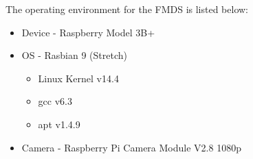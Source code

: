 The operating environment for the FMDS is listed below: 
\begin{itemize} 
	\item Device - Raspberry Model 3B+
	\item OS - Rasbian 9 (Stretch) 
	\begin{itemize}
		\item Linux Kernel v14.4
		\item gcc v6.3
		\item apt v1.4.9
	\end{itemize}
	\item Camera - Raspberry Pi Camera Module V2.8 1080p
\end{itemize}





